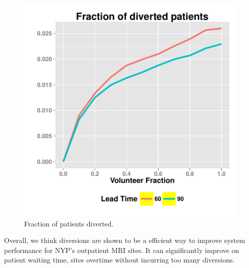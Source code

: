 \begin{figure}[htp]
\centering
\includegraphics[width=.6\textwidth]{chap3/numeric/pic/3sites_all_diversion}
\caption{Fraction of patients diverted.}
\label{fig:3sites_all_diversion}
\end{figure}

Overall, we think diversions are shown to be a efficient way to
improve system performance for NYP's outpatient MRI sites.
It can significantly improve on patient waiting time, sites overtime
without incurring too many diversions.
